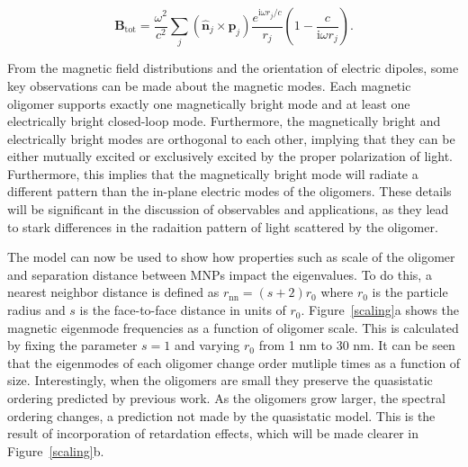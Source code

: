 \documentclass[12pt, letterpaper, twoside]{report}
\begin{document}
\begin{equation}
\textbf{B}_{\textrm{tot}} = \frac{\omega^2}{c^2}\sum_{j}(\hat{\textbf{n}}_{j}\times\textbf{p}_{j})\frac{e^{\textrm{i}\omega r_j/c}}{r_j}\left(1 - \frac{c}{\textrm{i}\omega r_{j}}\right).
\label{magnetic_field}
\end{equation}

\noindent From the magnetic field distributions and the orientation of electric dipoles, some key observations can be made about the magnetic modes. Each magnetic oligomer supports exactly one magnetically bright mode and at least one electrically bright closed-loop mode. Furthermore, the magnetically bright and electrically bright modes are orthogonal to each other, implying that they can be either mutually excited or exclusively excited by the proper polarization of light. Furthermore, this implies that the magnetically bright mode will radiate a different pattern than the in-plane electric modes of the oligomers. These details will be significant in the discussion of observables and applications, as they lead to stark differences in the radaition pattern of light scattered by the oligomer.

The model can now be used to show how properties such as scale of the oligomer and separation distance between MNPs impact the eigenvalues. To do this, a nearest neighbor distance is defined as $r_{\textrm{nn}} = (s+2)r_0$ where $r_0$ is the particle radius and $s$ is the face-to-face distance in units of $r_0$. Figure~\ref{scaling}a shows the magnetic eigenmode frequencies as a function of oligomer scale. This is calculated by fixing the parameter $s=1$ and varying $r_0$ from 1 nm to 30 nm. It can be seen that the eigenmodes of each oligomer change order mutliple times as a function of size. Interestingly, when the oligomers are small they preserve the quasistatic ordering predicted by previous work\cite{Cherqui2014}. As the oligomers grow larger, the spectral ordering changes, a prediction not made by the quasistatic model. This is the result of incorporation of retardation effects, which will be made clearer in Figure~\ref{scaling}b.
\end{document}
